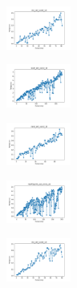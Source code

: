 \vspace*{\fill}
\newpage
\vspace*{\fill}

\begin{figure}[H]
    \centering
    \begin{subfigure}
        \centering
        \includegraphics[width=0.234\textwidth]{img/bl/iris_set_const_10_949004259_time.png}
    \end{subfigure}
    \hfill
    \begin{subfigure}
        \centering
        \includegraphics[width=0.234\textwidth]{img/bl/ecoli_set_const_10_949004259_time.png}
    \end{subfigure}
    \hfill
    \begin{subfigure}
        \centering
        \includegraphics[width=0.234\textwidth]{img/bl/rand_set_const_10_949004259_time.png}
    \end{subfigure}
    \hfill
    \begin{subfigure}
        \centering
        \includegraphics[width=0.234\textwidth]{img/bl/newthyroid_set_const_10_949004259_time.png}
    \end{subfigure}
    \hfill
    \begin{subfigure}
        \centering
        \includegraphics[width=0.234\textwidth]{img/bl/iris_set_const_10_589741062_time.png}

\end{subfigure}
\end{figure}
